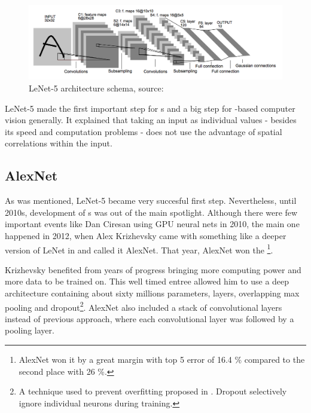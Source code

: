 \begin{figure}[H]
   \centering
	\includegraphics[width=\linewidth]{./pictures/lenet.png}
	\caption[LeNet-5 architecture]{LeNet-5 architecture schema, source: 
\cite{lenet5}}
      \label{fig:lenet}
\end{figure}

LeNet-5 made the first important step for s and a big step for 
-based computer vision generally. It explained that taking an input as 
individual values - besides its speed and computation problems - does not use 
the advantage of spatial correlations within the input. 



\subsection{AlexNet} %
\label{alexnet}

As was mentioned, LeNet-5 became very succesful first step. Nevertheless, until 
2010s, development of s was out of the main spotlight. Although there 
were few important events like Dan Ciresan using GPU neural nets in 2010, the 
main one happened in 2012, when Alex Krizhevsky came with something like a 
deeper version of LeNet in \cite{cnn-classification} and called it AlexNet. That 
year, AlexNet won the \footnote{AlexNet won it by a great margin with 
top 5 error of 16.4 \% compared to the second place with 26 \%.}.

Krizhevsky benefited from years of progress bringing more computing power and 
more data to be trained on. This well timed entree allowed him to use a deep 
architecture containing about sixty millions parameters,  layers, 
overlapping max pooling and dropout\footnote{A technique used to prevent 
overfitting proposed in \cite{dropout}. Dropout selectively ignore individual 
neurons during training.}. AlexNet also included a stack of convolutional layers 
instead of previous approach, where each convolutional layer was followed by a 
pooling layer. 

